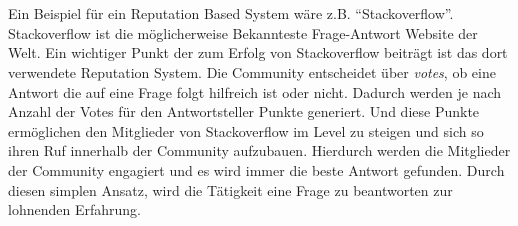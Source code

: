 \documentclass[a4paper,12pt]{scrartcl}
\begin{document}
\\\\
Ein Beispiel für ein Reputation Based System wäre z.B. \enquote{Stackoverflow}. Stackoverflow ist die möglicherweise Bekannteste Frage-Antwort Website der Welt. Ein wichtiger Punkt der zum Erfolg von Stackoverflow beiträgt ist das dort verwendete Reputation System. Die Community entscheidet über \textit{votes}, ob eine Antwort die auf eine Frage folgt hilfreich ist oder nicht. Dadurch werden je nach Anzahl der Votes für den Antwortsteller Punkte generiert. Und diese Punkte ermöglichen den Mitglieder von Stackoverflow im Level zu steigen und sich so ihren Ruf innerhalb der Community aufzubauen. Hierdurch werden die Mitglieder der Community engagiert und es wird immer die beste Antwort gefunden. Durch diesen simplen Ansatz, wird die Tätigkeit eine Frage zu beantworten zur lohnenden Erfahrung.
\end{document}

